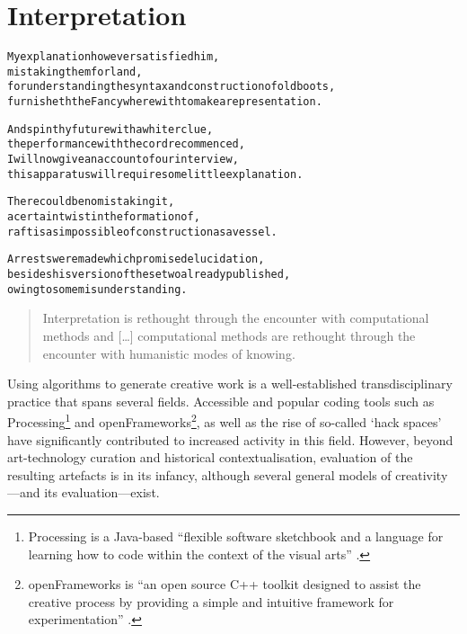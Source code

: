 
\chapter{Interpretation}
\label{ch:interpretation}

\startcontents[chapters]

\vfill

\begin{alltt}\sffamily
My explanation however satisfied him,
mistaking them for land,
for understanding the syntax and construction of old boots,
furnisheth the Fancy wherewith to make a representation.

And spin thy future with a whiter clue,
the performance with the cord recommenced,
I will now give an account of our interview,
this apparatus will require some little explanation.

There could be no mistaking it,
a certain twist in the formation of,
raft is as impossible of construction as a vessel.

Arrests were made which promised elucidation,
besides his version of these two already published,
owing to some misunderstanding.
\end{alltt}

\newpage
\minicontents
\spirals



\begin{quotation}
  Interpretation is rethought through the encounter with computational methods and [\ldots] computational methods are rethought through the encounter with humanistic modes of knowing. 
\end{quotation}

Using algorithms to generate creative work is a well-established transdisciplinary practice that spans several fields. Accessible and popular coding tools such as Processing\footnote{Processing is a Java-based ``flexible software sketchbook and a language for learning how to code within the context of the visual arts'' \autocite{Frynd}.} and openFrameworks\footnote{openFrameworks is ``an open source C++ toolkit designed to assist the creative process by providing a simple and intuitive framework for experimentation'' \autocite{Liebermannd}.}, as well as the rise of so-called `hack spaces' have significantly contributed to increased activity in this field. However, beyond art-technology curation and historical contextualisation, evaluation of the resulting artefacts is in its infancy, although several general models of creativity---and its evaluation---exist.

